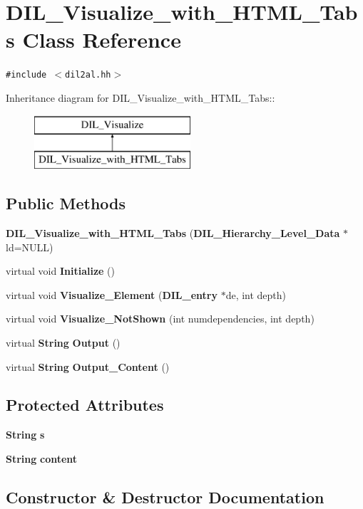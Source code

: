 \section{DIL\_\-Visualize\_\-with\_\-HTML\_\-Tabs  Class Reference}
\label{classDIL__Visualize__with__HTML__Tabs}
{\tt \#include $<$dil2al.hh$>$}

Inheritance diagram for DIL\_\-Visualize\_\-with\_\-HTML\_\-Tabs::\begin{figure}[H]
\begin{center}
\leavevmode
\includegraphics[height=2cm]{classDIL__Visualize__with__HTML__Tabs}
\end{center}
\end{figure}
\subsection*{Public Methods}
\begin{CompactItemize}
\item 
{\bf DIL\_\-Visualize\_\-with\_\-HTML\_\-Tabs} ({\bf DIL\_\-Hierarchy\_\-Level\_\-Data} $\ast$ld=NULL)
\item 
virtual void {\bf Initialize} ()
\item 
virtual void {\bf Visualize\_\-Element} ({\bf DIL\_\-entry} $\ast$de, int depth)
\item 
virtual void {\bf Visualize\_\-Not\-Shown} (int numdependencies, int depth)
\item 
virtual {\bf String} {\bf Output} ()
\item 
virtual {\bf String} {\bf Output\_\-Content} ()
\end{CompactItemize}
\subsection*{Protected Attributes}
\begin{CompactItemize}
\item 
{\bf String} {\bf s}
\item 
{\bf String} {\bf content}
\end{CompactItemize}


\subsection{Constructor \& Destructor Documentation}
